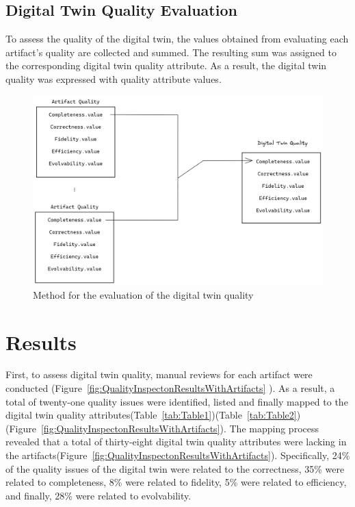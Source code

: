 \documentclass{llncs}
\begin{document}
    \subsection{Digital Twin Quality Evaluation}
    To assess the quality of the digital twin, the values obtained from evaluating each artifact's quality are collected and summed. 
    The resulting sum was assigned to the corresponding digital twin quality attribute. 
    As a result, the digital twin quality was expressed with quality attribute values.    
  

    \begin{figure}[htbp]
        \includegraphics[scale = 0.25]{DigitalTwinQuality.png}
            \caption{Method for the evaluation of the digital twin quality}
        \label{fig:MethodforDigitalTwinQuality}
    \end{figure}
   
    
    \section{Results}

    First, to assess digital twin quality, manual reviews for each artifact were conducted (Figure~\ref{fig:QualityInspectonResultsWithArtifacts} ). 
    As a result, a total of twenty-one quality issues were identified, listed and finally mapped to the digital twin quality attributes(Table~\ref{tab:Table1})(Table~\ref{tab:Table2})(Figure~\ref{fig:QualityInspectonResultsWithArtifacts}).
    The mapping process revealed that a total of thirty-eight digital twin quality attributes were lacking in the artifacts(Figure~\ref{fig:QualityInspectonResultsWithArtifacts}).  
    Specifically, 24\% of the quality issues of the digital twin were related to the correctness, 35\%  were related to completeness, 8\%  were related to fidelity, 5\%  were related to efficiency,
    and finally, 28\% were related to evolvability.  
\end{document}
